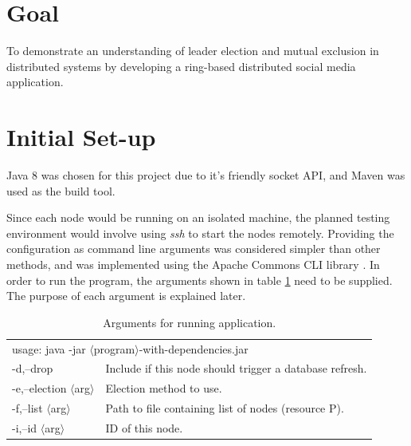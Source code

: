 \documentclass[12pt]{article}
\begin{document}
\begin{titlepage}

\vfill %

\end{titlepage}

\section*{Goal}

To demonstrate an understanding of leader election and mutual exclusion in distributed systems by developing a ring-based distributed social media application.

\tableofcontents
\newpage

\setcounter{page}{1} 

\section{Initial Set-up}

Java 8 was chosen for this project due to it's friendly socket API, and Maven \cite{maven} was used as the build tool. 

Since each node would be running on an isolated machine, the planned testing environment would involve using \emph{ssh} to start the nodes remotely. Providing the configuration as command line arguments was considered simpler than other methods, and was implemented using the Apache Commons CLI library \cite{apachecli}. In order to run the program, the arguments shown in table \ref{tbl:arguments} need to be supplied. The purpose of each argument is explained later.

\renewcommand{\arraystretch}{1.5}
\begin{table}[!ht]
\centering
\begin{tabular}{ll}
\multicolumn{2}{l}{usage: java -jar $\langle$program$\rangle$-with-dependencies.jar}
\\ 

 -d,--drop           &  Include if this node should trigger a database refresh. \\
 -e,--election $\langle$arg$\rangle$ &  Election method to use. \\
 -f,--list $\langle$arg$\rangle$     &  Path to file containing list of nodes (resource P). \\
 -i,--id $\langle$arg$\rangle$       &  ID of this node. 
\end{tabular}
\caption{Arguments for running application.}
\label{tbl:arguments}
\end{table}
\end{document}
